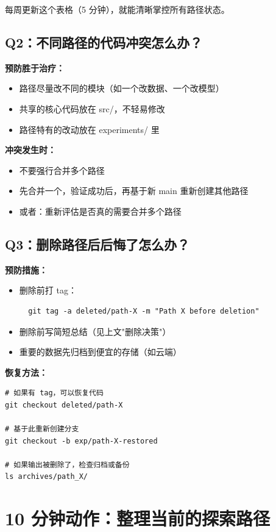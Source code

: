 每周更新这个表格（5 分钟），就能清晰掌控所有路径状态。

\subsection{Q2：不同路径的代码冲突怎么办？}

\textbf{预防胜于治疗：}
\begin{itemize}
  \item 路径尽量改不同的模块（如一个改数据、一个改模型）
  \item 共享的核心代码放在 src/，不轻易修改
  \item 路径特有的改动放在 experiments/ 里
\end{itemize}

\textbf{冲突发生时：}
\begin{itemize}
  \item 不要强行合并多个路径
  \item 先合并一个，验证成功后，再基于新 main 重新创建其他路径
  \item 或者：重新评估是否真的需要合并多个路径
\end{itemize}

\subsection{Q3：删除路径后后悔了怎么办？}

\textbf{预防措施：}
\begin{itemize}
  \item 删除前打 tag：
  \begin{verbatim}
  git tag -a deleted/path-X -m "Path X before deletion"
  \end{verbatim}
  \item 删除前写简短总结（见上文"删除决策"）
  \item 重要的数据先归档到便宜的存储（如云端）
\end{itemize}

\textbf{恢复方法：}
\begin{verbatim}
# 如果有 tag，可以恢复代码
git checkout deleted/path-X

# 基于此重新创建分支
git checkout -b exp/path-X-restored

# 如果输出被删除了，检查归档或备份
ls archives/path_X/
\end{verbatim}

\section{10 分钟动作：整理当前的探索路径}

